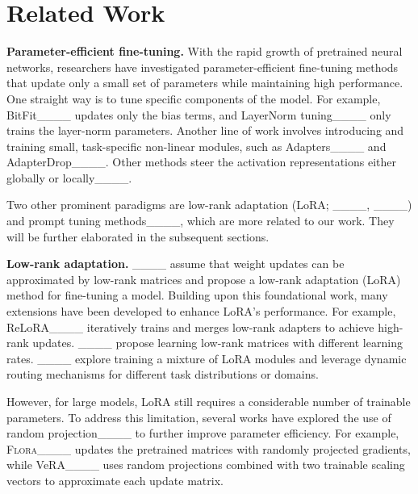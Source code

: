 \section{Related Work}
\textbf{Parameter-efficient fine-tuning.}
With the rapid growth of pretrained neural networks, researchers have investigated parameter-efficient fine-tuning methods that update only a small set of parameters while maintaining high performance. One straight way is to tune specific components of the model. For example, BitFit____ updates only the bias terms, and LayerNorm tuning____ only trains the layer-norm parameters.
Another line of work involves introducing and training small, task-specific non-linear modules, such as Adapters____ and AdapterDrop____. Other methods steer the activation representations either globally or locally____.

Two other prominent paradigms are low-rank adaptation (LoRA; ____, ____) and prompt tuning methods____, which are more related to our work. They will be further elaborated in the subsequent sections. 


\textbf{Low-rank adaptation.} ____ assume that weight updates can be approximated by low-rank matrices and propose a low-rank adaptation (LoRA) method for fine-tuning a model.  Building upon this foundational work, many extensions have been developed to enhance LoRA’s performance. For example, ReLoRA____ iteratively trains and merges low-rank adapters to achieve high-rank updates. 
____ propose learning low-rank matrices with different learning rates.
____ explore training a mixture of LoRA modules and leverage dynamic routing mechanisms for different task distributions or domains.

However, for large models, LoRA still requires a considerable number of trainable parameters. To address this limitation, several works have explored the use of random projection____ to further improve parameter efficiency. For example, \textsc{Flora}____ updates the pretrained matrices with randomly projected gradients, while VeRA____ uses random projections combined with two trainable scaling vectors to approximate each update matrix. 

